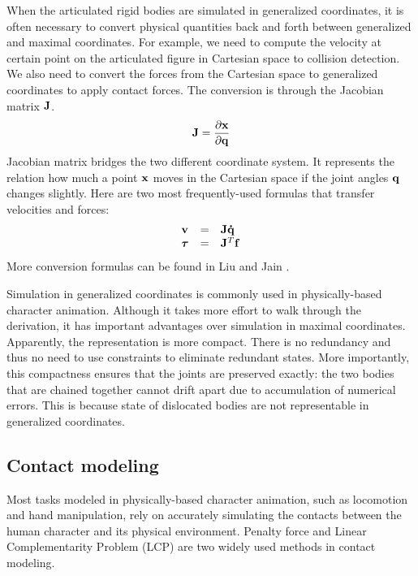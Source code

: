 When the articulated rigid bodies are simulated in generalized coordinates, it is often necessary to convert physical quantities back and forth between generalized and maximal coordinates. For example, we need to compute the velocity at certain point on the articulated figure in Cartesian space to collision detection. We also need to convert the forces from the Cartesian space to generalized coordinates to apply contact forces. The conversion is through the Jacobian matrix $\mathbf{J}$.
\begin{equation}
\mathbf{J}=\frac{\partial \mathbf{x}}{\partial \mathbf{q}}
\end{equation}
Jacobian matrix bridges the two different coordinate system. It represents the relation how much a point $\mathbf{x}$ moves in the Cartesian space if the joint angles $\mathbf{q}$ changes slightly. Here are two most frequently-used formulas that transfer velocities and forces:
\begin{displaymath}
  \begin{array}{lll}
    \mathbf{v} & = & \mathbf{J}\mathbf{\dot{q}}\\
    \boldsymbol{\tau} & = &\mathbf{J}^T\mathbf{f}
   \end{array}
\end{displaymath}
More conversion formulas can be found in Liu and Jain \cite{}.

Simulation in generalized coordinates is commonly used in physically-based character animation. Although it takes more effort to walk through the derivation, it has important advantages over simulation in maximal coordinates. Apparently, the representation is more compact. There is no redundancy and thus no need to use constraints to eliminate redundant states. More importantly, this compactness ensures that the joints are preserved exactly: the two bodies that are chained together cannot drift apart due to accumulation of numerical errors. This is because state of dislocated bodies are not representable in generalized coordinates.

\subsection{Contact modeling}

Most tasks modeled in physically-based character animation, such as locomotion and hand manipulation, rely on accurately simulating the contacts between the human character and its physical environment. Penalty force and Linear Complementarity Problem (LCP) are two widely used methods in contact modeling.

